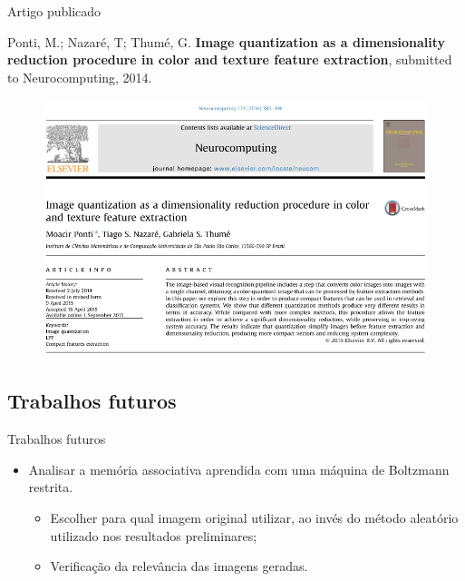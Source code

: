 \documentclass{beamer}
\begin{document}
\begin{frame}{Artigo publicado}
  \setlength\leftmargini{1em}

  \begin{block}{}
    \justifying
    \tiny{
    Ponti, M.; Nazaré, T; Thumé, G. \textbf{Image quantization as a dimensionality reduction procedure in color and texture feature extraction}, submitted to Neurocomputing, 2014.}
  \end{block}
  \begin{figure}
    \begin{center}
      \includegraphics[width=0.7\linewidth]{figuras/artigo.png}
    \end{center}
  \end{figure}
\end{frame}
\subsection{Trabalhos futuros}
\begin{frame}{Trabalhos futuros}
  \setlength\leftmargini{1em}
  \justifying
  \begin{itemize}
    \item Analisar a memória associativa aprendida com uma máquina de Boltzmann restrita.
    \begin{itemize}
      \item Escolher para qual imagem original utilizar, ao invés do método aleatório utilizado nos resultados preliminares;
      \item Verificação da relevância das imagens geradas.
    \end{itemize}
  \end{itemize}
\end{frame}
\end{document}
